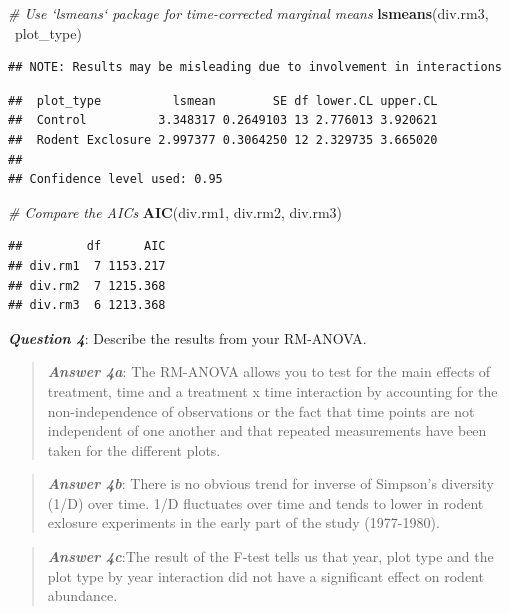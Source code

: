 \documentclass[]{article}
\newenvironment{Shaded}{\begin{snugshade}}{\end{snugshade}}
\newcommand{\KeywordTok}[1]{\textcolor[rgb]{0.13,0.29,0.53}{\textbf{{#1}}}}
\newcommand{\CommentTok}[1]{\textcolor[rgb]{0.56,0.35,0.01}{\textit{{#1}}}}
\newcommand{\NormalTok}[1]{{#1}}
\begin{document}
\begin{Shaded}
\begin{Highlighting}[]
\CommentTok{# Use `lsmeans` package for time-corrected marginal means}
\KeywordTok{lsmeans}\NormalTok{(div.rm3, ~plot_type)}
\end{Highlighting}
\end{Shaded}

\begin{verbatim}
## NOTE: Results may be misleading due to involvement in interactions
\end{verbatim}

\begin{verbatim}
##  plot_type          lsmean        SE df lower.CL upper.CL
##  Control          3.348317 0.2649103 13 2.776013 3.920621
##  Rodent Exclosure 2.997377 0.3064250 12 2.329735 3.665020
## 
## Confidence level used: 0.95
\end{verbatim}

\begin{Shaded}
\begin{Highlighting}[]
\CommentTok{# Compare the AICs}
\KeywordTok{AIC}\NormalTok{(div.rm1, div.rm2, div.rm3)}
\end{Highlighting}
\end{Shaded}

\begin{verbatim}
##         df      AIC
## div.rm1  7 1153.217
## div.rm2  7 1215.368
## div.rm3  6 1213.368
\end{verbatim}

\textbf{\emph{Question 4}}: Describe the results from your RM-ANOVA.

\begin{quote}
\textbf{\emph{Answer 4a}}: The RM-ANOVA allows you to test for the main
effects of treatment, time and a treatment x time interaction by
accounting for the non-independence of observations or the fact that
time points are not independent of one another and that repeated
measurements have been taken for the different plots.
\end{quote}

\begin{quote}
\textbf{\emph{Answer 4b}}: There is no obvious trend for inverse of
Simpson's diversity (1/D) over time. 1/D fluctuates over time and tends
to lower in rodent exlosure experiments in the early part of the study
(1977-1980).
\end{quote}

\begin{quote}
\textbf{\emph{Answer 4c}}:The result of the F-test tells us that year,
plot type and the plot type by year interaction did not have a
significant effect on rodent abundance.
\end{quote}
\end{document}
